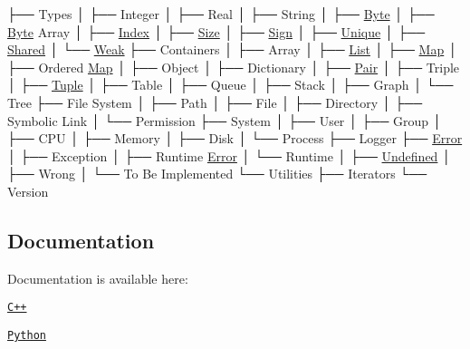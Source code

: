 \begin{DoxyCode}
├── Types
│   ├── Integer
│   ├── Real
│   ├── String
│   ├── \hyperlink{namespaceostk_1_1core_1_1types_a0733eebee5d093ea04df859028e2649f}{Byte}
│   ├── \hyperlink{namespaceostk_1_1core_1_1types_a0733eebee5d093ea04df859028e2649f}{Byte} Array
│   ├── \hyperlink{namespaceostk_1_1core_1_1types_a6e63c1b15b2e5bc87a43771c09fa913a}{Index}
│   ├── \hyperlink{namespaceostk_1_1core_1_1types_acf68f214a245e35a7c1994c84dc56746}{Size}
│   ├── \hyperlink{namespaceostk_1_1core_1_1types_ae10e15cf66b50aaec17f4f78c984d7bf}{Sign}
│   ├── \hyperlink{namespaceostk_1_1core_1_1types_a0ff1c5e84c7c42c929044b1be97ba680}{Unique}
│   ├── \hyperlink{namespaceostk_1_1core_1_1types_a3e7aff47b81452ed1f18f6d8f6c90140}{Shared}
│   └── \hyperlink{namespaceostk_1_1core_1_1types_a0dd80951dd3139e43b5c0b3e5928d08a}{Weak}
├── Containers
│   ├── Array
│   ├── \hyperlink{namespaceostk_1_1core_1_1ctnr_a5802e21d045076175dcb310a7045c858}{List}
│   ├── \hyperlink{namespaceostk_1_1core_1_1ctnr_a2184a633cc52230b0617fab960393bc5}{Map}
│   ├── Ordered \hyperlink{namespaceostk_1_1core_1_1ctnr_a2184a633cc52230b0617fab960393bc5}{Map}
│   ├── Object
│   ├── Dictionary
│   ├── \hyperlink{namespaceostk_1_1core_1_1ctnr_a08e64f04352e3c432bff0cfd3b23923b}{Pair}
│   ├── Triple
│   ├── \hyperlink{namespaceostk_1_1core_1_1ctnr_a7f01ca040222e5b0c02a90aa68cc8e88}{Tuple}
│   ├── Table
│   ├── Queue
│   ├── Stack
│   ├── Graph
│   └── Tree
├── File System
│   ├── Path
│   ├── File
│   ├── Directory
│   ├── Symbolic Link
│   └── Permission
├── System
│   ├── User
│   ├── Group
│   ├── CPU
│   ├── Memory
│   ├── Disk
│   └── Process
├── Logger
├── \hyperlink{namespaceostk_1_1core_1_1logger_a52d02954e094391f067befffe7f3cae9a902b0d55fddef6f8d651fe1035b7d4bd}{Error}
│   ├── Exception
│   ├── Runtime \hyperlink{namespaceostk_1_1core_1_1logger_a52d02954e094391f067befffe7f3cae9a902b0d55fddef6f8d651fe1035b7d4bd}{Error}
│   └── Runtime
│       ├── \hyperlink{namespaceostk_1_1core_1_1types_ae10e15cf66b50aaec17f4f78c984d7bfaec0fc0100c4fc1ce4eea230c3dc10360}{Undefined}
│       ├── Wrong
│       └── To Be Implemented
└── Utilities
    ├── Iterators
    └── Version
\end{DoxyCode}


\subsection*{Documentation}

Documentation is available here\+:


\begin{DoxyItemize}
\item \href{https://open-space-collective.github.io/open-space-toolkit-core}{\tt C++}
\item \href{./bindings/python/docs}{\tt Python}
\end{DoxyItemize}

